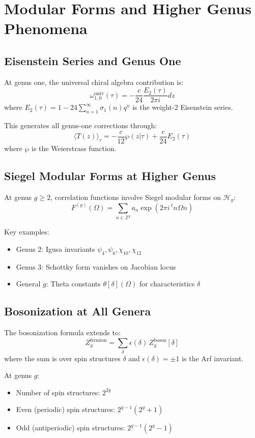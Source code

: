 \chapter{Modular Forms and Higher Genus Phenomena}

\section{Eisenstein Series and Genus One}

At genus one, the universal chiral algebra contribution is:
$$\omega_{1,0}^{\text{univ}}(\tau) = -\frac{c}{24} \frac{E_2(\tau)}{2\pi i} dz$$
where $E_2(\tau) = 1 - 24\sum_{n=1}^{\infty} \sigma_1(n)q^n$ is the weight-2 Eisenstein series.

This generates all genus-one corrections through:
$$\langle T(z) \rangle_{\tau} = -\frac{c}{12} \wp(z|\tau) + \frac{c}{24} E_2(\tau)$$
where $\wp$ is the Weierstrass function.

\section{Siegel Modular Forms at Higher Genus}

At genus $g \geq 2$, correlation functions involve Siegel modular forms on $\mathcal{H}_g$:
$$F^{(g)}(\Omega) = \sum_{n \in \mathbb{Z}^g} a_n \exp(2\pi i \, {}^t n \Omega n)$$

Key examples:
\begin{itemize}
\item Genus 2: Igusa invariants $\psi_4, \psi_6, \chi_{10}, \chi_{12}$
\item Genus 3: Schottky form vanishes on Jacobian locus
\item General $g$: Theta constants $\theta[\delta](\Omega)$ for characteristics $\delta$
\end{itemize}

\section{Bosonization at All Genera}

The bosonization formula extends to:
$$Z_g^{\text{fermion}} = \sum_{\delta} \epsilon(\delta) \, Z_g^{\text{boson}}[\delta]$$
where the sum is over spin structures $\delta$ and $\epsilon(\delta) = \pm 1$ is the Arf invariant.

At genus $g$:
\begin{itemize}
\item Number of spin structures: $2^{2g}$
\item Even (periodic) spin structures: $2^{g-1}(2^g + 1)$
\item Odd (antiperiodic) spin structures: $2^{g-1}(2^g - 1)$
\end{itemize}

